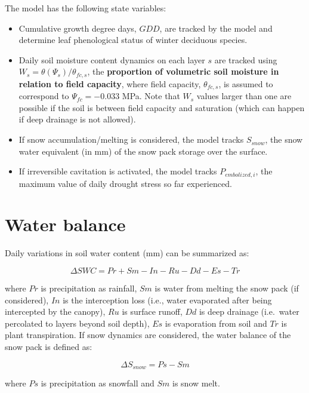 \documentclass[]{book}
\providecommand{\tightlist}{%
  \setlength{\itemsep}{0pt}\setlength{\parskip}{0pt}}
\begin{document}
The model has the following state variables:

\begin{itemize}
\tightlist
\item
  Cumulative growth degree days, \(GDD\), are tracked by the model and determine leaf phenological status of winter deciduous species.
\item
  Daily soil moisture content dynamics on each layer \(s\) are tracked using \(W_s = \theta(\Psi_s)/ \theta_{fc,s}\), the \textbf{proportion of volumetric soil moisture in relation to field capacity}, where field capacity, \(\theta_{fc,s}\), is assumed to correspond to \(\Psi_{fc} = -0.033\) MPa. Note that \(W_s\) values larger than one are possible if the soil is between field capacity and saturation (which can happen if deep drainage is not allowed).
\item
  If snow accumulation/melting is considered, the model tracks \(S_{snow}\), the snow water equivalent (in mm) of the snow pack storage over the surface.
\item
  If irreversible cavitation is activated, the model tracks \(P_{embolized,i}\), the maximum value of daily drought stress so far experienced.
\end{itemize}

\hypertarget{water-balance}{%
\section{Water balance}\label{water-balance}}

Daily variations in soil water content (mm) can be summarized as:

\begin{equation}
\Delta{SWC} = Pr + Sm - In - Ru - Dd - Es -Tr
\end{equation}

where \(Pr\) is precipitation as rainfall, \(Sm\) is water from melting the snow pack (if considered), \(In\) is the interception loss (i.e., water evaporated after being intercepted by the canopy), \(Ru\) is surface runoff, \(Dd\) is deep drainage (i.e.~water percolated to layers beyond soil depth), \(Es\) is evaporation from soil and \(Tr\) is plant transpiration. If snow dynamics are considered, the water balance of the snow pack is defined as:

\begin{equation}
\Delta{S_{snow}} = Ps - Sm
\end{equation}

where \(Ps\) is precipitation as snowfall and \(Sm\) is snow melt.
\end{document}
